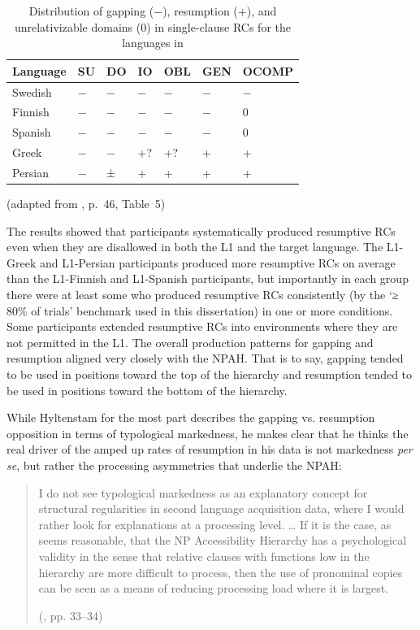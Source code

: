 \begin{table}
\caption{Distribution of gapping (−), resumption (+), and unrelativizable domains (0) in single-clause RCs for the languages in \textcite{hyltenstam1984,hyltenstam1990}}\label{tab:hyltenstam}
\raggedright{}
\begin{tabularx}{\linewidth}{lZZZZZZ}\hline
Language & SU & DO & IO & OBL & GEN & OCOMP \\\hline
Swedish & − & − & − & − & − & − \\
Finnish & − & − & − & − & − & 0 \\
Spanish & − & − & − & − & − & 0 \\
Greek & − & − & +? & +? & + & + \\
Persian & − & ± & + & + & + & + \\\hline
\end{tabularx}\par\nobreak\vspace{5pt}
\hfill (adapted from \cite{hyltenstam1984}, p.~46, Table~5)
\vspace{-12pt}
\end{table}

The results showed that participants systematically produced resumptive RCs even when they are disallowed in both the L1 and the target language. The L1-Greek and L1-Persian participants produced more resumptive RCs on average than the L1-Finnish and L1-Spanish participants, but importantly in each group there were at least some who produced resumptive RCs consistently (by the `≥ 80\% of trials' benchmark used in this dissertation) in one or more conditions. Some participants extended resumptive RCs into environments where they are not permitted in the L1. The overall production patterns for gapping and resumption aligned very closely with the NPAH. That is to say, gapping tended to be used in positions toward the top of the hierarchy and resumption tended to be used in positions toward the bottom of the hierarchy. 

While Hyltenstam for the most part describes the gapping vs. resumption opposition in terms of typological markedness, he makes clear that he thinks the real driver of the amped up rates of resumption in his data is not markedness \textit{per se}, but rather the processing asymmetries that underlie the NPAH:

\begin{quote}
I do not see typological markedness as an explanatory concept for structural regularities in second language acquisition data, where I would rather look for explanations at a processing level. \dots{} If it is the case, as seems reasonable, that the NP Accessibility Hierarchy has a psychological validity in the sense that relative clauses with functions low in the hierarchy are more difficult to process, then the use of pronominal copies can be seen as a means of reducing processing load where it is largest.\par\nobreak
\hfill (\cite{hyltenstam1990}, pp. 33--34)
\end{quote}
\vspace{-12pt}

